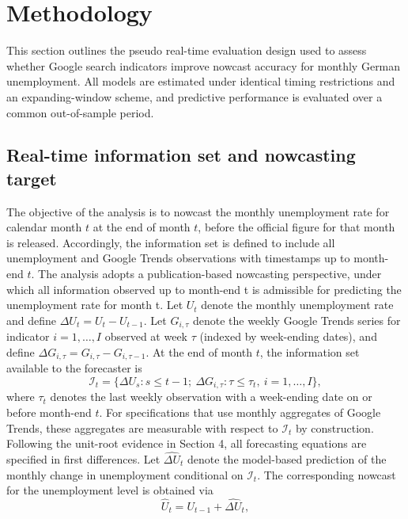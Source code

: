 \documentclass[12pt,a4paper]{article}
\begin{document}
\section{Methodology}
\label{sec:methodology}
This section outlines the pseudo real-time evaluation design used to assess whether Google search indicators improve nowcast accuracy for monthly German unemployment. All models are estimated under identical timing restrictions and an expanding-window scheme, and predictive performance is evaluated over a common out-of-sample period.

\subsection{Real-time information set and nowcasting target}
\label{subsec:info_set}
The objective of the analysis is to nowcast the monthly unemployment rate for calendar month $t$ at the end of month $t$, before the official figure for that month is released.
Accordingly, the information set is defined to include all unemployment and Google Trends observations with timestamps up to month-end $t$.
 The analysis adopts a publication-based nowcasting perspective, under which all information observed up to month-end t is admissible for predicting the unemployment rate for month t. 
Let $U_t$ denote the monthly unemployment rate and define $\Delta U_t = U_t - U_{t-1}$.
Let $G_{i,\tau}$ denote the weekly Google Trends series for indicator $i=1,\dots,I$ observed at week $\tau$ (indexed by week-ending dates),
and define $\Delta G_{i,\tau} = G_{i,\tau} - G_{i,\tau-1}$.
At the end of month $t$, the information set available to the forecaster is
\begin{equation}
\mathcal{I}_t =
\big\{ \Delta U_s : s \le t-1;\ 
       \Delta G_{i,\tau} : \tau \le \tau_t,\ i=1,\dots,I \big\},
\label{eq:info_set}
\end{equation}
where $\tau_t$ denotes the last weekly observation with a week-ending date on or before month-end $t$.
For specifications that use monthly aggregates of Google Trends,
these aggregates are measurable with respect to $\mathcal{I}_t$ by construction.
Following the unit-root evidence in Section 4, all forecasting equations are specified in first differences. Let $\widehat{\Delta U}_t$ denote the model-based prediction of the monthly change in unemployment conditional on $\mathcal{I}_t$. The corresponding nowcast for the unemployment level is obtained via
\begin{equation}
    \widehat{U}_t = U_{t-1} + \widehat{\Delta U}_t,
    \label{eq:level_forecast}
\end{equation}
\end{document}

